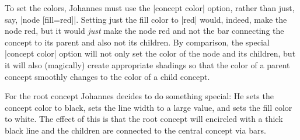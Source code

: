 To set the colors, Johannes must use the |concept color| option,
rather than just, say, |node [fill=red]|. Setting just the fill color
to |red| would, indeed, make the node red, but it would \emph{just}
make the node red and not the bar connecting the concept to its parent
and also not its children. By comparison, the special |concept color|
option will not only set the color of the node and its children, but
it will also (magically) create appropriate shadings so that the color
of a parent concept smoothly changes to the color of a child concept.

For the root concept Johannes decides to do something special: He sets
the concept color to black, sets the line width to a large value, and
sets the fill color to white. The effect of this is that the root
concept will encircled with a thick black line and the children are
connected to the central concept via bars.

